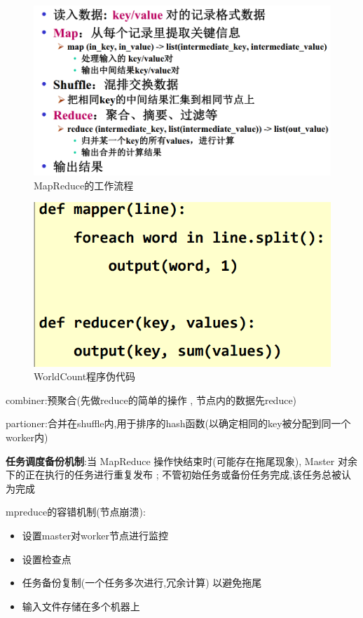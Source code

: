 \documentclass[UTF8,a4paper]{ctexart}
\begin{document}
\begin{figure}[H]
  \centering
  \includegraphics[scale = 0.3]{assets/ParallelComputing_a6e90.png}
  \caption{MapReduce的工作流程}
\end{figure}

\begin{figure}[H]
  \centering
  \includegraphics[scale = 0.3]{assets/ParallelComputing_497ec.png}
  \caption{WorldCount程序伪代码}
\end{figure}

combiner:预聚合(先做reduce的简单的操作 , 节点内的数据先reduce)

partioner:合并在shuffle内,用于排序的hash函数(以确定相同的key被分配到同一个worker内)

\textbf{任务调度备份机制}:当 MapReduce 操作快结束时(可能存在拖尾现象), Master 对余下的正在执行的任务进行重复发布 ; 不管初始任务或备份任务完成,该任务总被认为完成


mpreduce的容错机制(节点崩溃):

\begin{itemize}
  \item 设置master对worker节点进行监控
  \item 设置检查点
  \item 任务备份复制(一个任务多次进行,冗余计算) 以避免拖尾
  \item 输入文件存储在多个机器上
\end{itemize}
\end{document}
